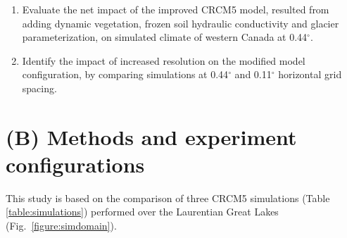 \documentclass[a0b,landscape]{a0poster}
\begin{document}
\begin{multicols*}{4}
\vspace{1cm}
\begin{tcolorbox}[colback=white,colframe=green!40!black,adjusted title={Main objectives}]
  \begin{enumerate}
  \item Evaluate the net impact of the improved CRCM5 model, resulted from adding
        dynamic vegetation, frozen soil hydraulic conductivity and glacier
        parameterization, on simulated climate of western Canada at 0.44$^\circ$.
  \item Identify the impact of increased resolution on the modified model configuration,
        by comparing simulations at 0.44$^\circ$ and 0.11$^\circ$ horizontal grid
        spacing.
  \end{enumerate}
\end{tcolorbox}


\section*{(B) Methods and experiment configurations}
%
This study is based on the comparison of three CRCM5 simulations (Table \ref{table:simulations}) performed over the Laurentian Great Lakes (Fig.~\ref{figure:simdomain}).\\[1cm]
%


\end{multicols*}
\end{document}
